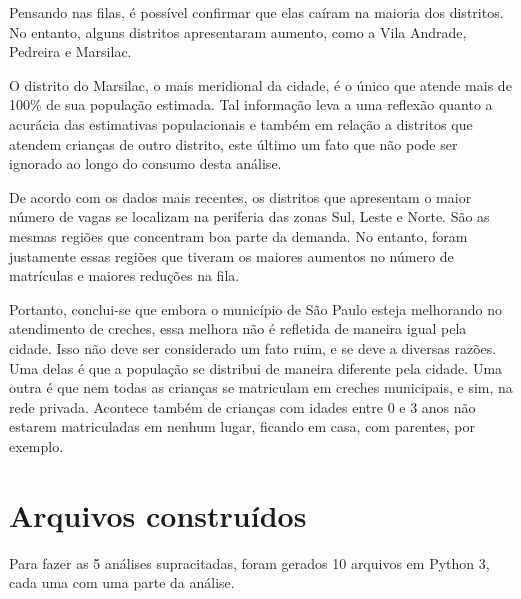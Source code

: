 \documentclass[12pt, a4paper]{article}
\begin{document}
Pensando nas filas, é possível confirmar que elas caíram na maioria dos distritos. No entanto, alguns distritos apresentaram aumento, como a Vila Andrade, Pedreira e Marsilac.

O distrito do Marsilac, o mais meridional da cidade, é o único que atende mais de 100\% de sua população estimada. Tal informação leva a uma reflexão quanto a acurácia das estimativas populacionais e também em relação a distritos que atendem crianças de outro distrito, este último um fato que não pode ser ignorado ao longo do consumo desta análise.

De acordo com os dados mais recentes, os distritos que apresentam o maior número de vagas se localizam na periferia das zonas Sul, Leste e Norte. São as mesmas regiões que concentram boa parte da demanda. No entanto, foram justamente essas regiões que tiveram os maiores aumentos no número de matrículas e maiores reduções na fila.

Portanto, conclui-se que embora o município de São Paulo esteja melhorando no atendimento de creches, essa melhora não é refletida de maneira igual pela cidade. Isso não deve ser considerado um fato ruim, e se deve a diversas razões. Uma delas é que a população se distribui de maneira diferente pela cidade. Uma outra é que nem todas as crianças se matriculam em creches municipais, e sim, na rede privada. Acontece também de crianças com idades entre 0 e 3 anos não estarem matriculadas em nenhum lugar, ficando em casa, com parentes, por exemplo.

\section{Arquivos construídos}

Para fazer as 5 análises supracitadas, foram gerados 10 arquivos em Python 3, cada uma com uma parte da análise.
\end{document}
